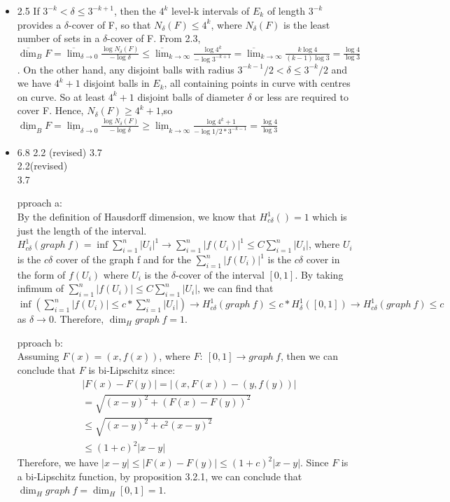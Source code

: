 \documentclass{article}
\begin{document}
\begin{itemize}
\item 2.5
If $3^{-k} < \delta \leq 3^{-k+1}$, then the $4^k$ level-k intervals of $E_k$ of length $3^{-k}$ provides a $\delta$-cover of F, so that $N_\delta(F) \leq 4^k$, where $N_\delta(F)$ is the least number of sets in a $\delta$-cover of F. From 2.3, $\overline{\dim}_B F = \overline{\lim}_{\delta \rightarrow 0} \frac{\log N_\delta (F)}{-\log \delta} \leq \overline{\lim}_{k \rightarrow \infty}\frac{\log 4^k}{-\log 3^{-k+1}} = \overline{\lim}_{k \rightarrow \infty}\frac{k \log 4}{(k-1)\log 3} = \frac{\log 4}{\log 3}$. On the other hand, any disjoint balls with radius $ 3^{-k-1}/2 < \delta \leq 3^{-k}/2$ and we have $4^k + 1$ disjoint balls in $E_k$, all containing points in curve with centres on curve. So at least $4^k +1$ disjoint balls of diameter $\delta$ or less are required to cover F. Hence, $N_\delta(F) \geq 4^k +1$,so $\underline{\dim}_B F = \underline{\lim}_{\delta \rightarrow 0}\frac{\log N_\delta (F)}{ - \log \delta} \geq \underline{\lim}_{k \rightarrow \infty}\frac{\log 4^k + 1}{-\log 1/2 * 3^{-k-1}} = \frac{\log 4 }{\log 3}$\\

\item 6.8 2.2 (revised) 3.7\\
2.2(revised)\\
3.7\\
\subtitle Approach a:\\
By the definition of Hausdorff dimension, we know that $H^1_{c\delta}() = 1$ which is just the length of the  interval. $H^1_{c\delta} (graph \ f) = \inf \sum_{i=1}^n |U_i|^1 \rightarrow \sum_{i=1}^n |f(U_i)|^1 \leq C\sum_{i=1}^n |U_i|$, where ${U_i}$ is the $c\delta$ cover of the graph f and for the $\sum_{i=1}^n |f(U_i)|^1$ is the $c\delta$ cover in the form of ${f(U_i)}$ where ${U_i}$ is the $\delta$-cover of the interval $[0,1]$. By taking infimum of $\sum_{i=1}^n |f(U_i)| \leq C\sum_{i=1}^n |U_i|$, we can find that $\inf (\sum_{i=1}^n |f(U_i)|\leq c*\sum_{i=1}^n |U_i|) \rightarrow H^1_{c\delta}(graph \ f) \leq c*H^1_\delta([0,1]) \rightarrow H^1_{c\delta}(graph \ f) \leq c$ as $\delta \rightarrow 0$. Therefore, $\dim_H graph \ f = 1$.\\
\subtitle Approach b:\\
Assuming $F(x) = (x,f(x))$, where $F: \ [0,1] \rightarrow graph \ f$, then we can conclude that $F$ is bi-Lipschitz since: 
\begin{align*}
&|F(x) - F(y)| = |(x,F(x)) - (y,f(y))|\\
&= \sqrt{(x-y)^2 + (F(x)-F(y))^2}\\
&\leq \sqrt{(x-y)^2 + c^2(x-y)^2}\\
&\leq (1+c)^2|x-y|
\end{align*}
Therefore, we have $|x-y|\leq |F(x) - F(y)|\leq(1+c)^2|x-y|$. Since $F$ is a bi-Lipschitz function, by proposition 3.2.1, we can conclude that $\dim_H graph \ f = \dim_H [0,1] = 1$. 


\end{itemize}
\end{document}
